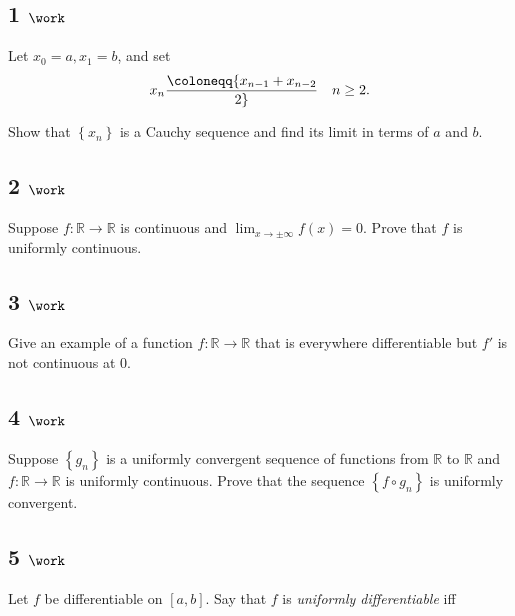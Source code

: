 \hypertarget{work}{%
\subsection{\texorpdfstring{1
\(\work\)}{1 \textbackslash work}}\label{work}}

Let \(x_0 = a, x_1 = b\), and set
\begin{align*}  
x_n \coloneqq{x_{n-1} + x_{n-2} \over 2} \quad n\geq 2
.\end{align*}

Show that \(\left\{{x_n}\right\}\) is a Cauchy sequence and find its
limit in terms of \(a\) and \(b\).

\hypertarget{work-1}{%
\subsection{\texorpdfstring{2
\(\work\)}{2 \textbackslash work}}\label{work-1}}

Suppose \(f:{\mathbb{R}}\to{\mathbb{R}}\) is continuous and
\(\lim_{x\to \pm \infty} f(x) = 0\). Prove that \(f\) is uniformly
continuous.

\hypertarget{work-2}{%
\subsection{\texorpdfstring{3
\(\work\)}{3 \textbackslash work}}\label{work-2}}

Give an example of a function \(f:{\mathbb{R}}\to {\mathbb{R}}\) that is
everywhere differentiable but \(f'\) is not continuous at 0.

\hypertarget{work-3}{%
\subsection{\texorpdfstring{4
\(\work\)}{4 \textbackslash work}}\label{work-3}}

Suppose \(\left\{{g_n}\right\}\) is a uniformly convergent sequence of
functions from \({\mathbb{R}}\) to \({\mathbb{R}}\) and
\(f:{\mathbb{R}}\to {\mathbb{R}}\) is uniformly continuous. Prove that
the sequence \(\left\{{f\circ g_n}\right\}\) is uniformly convergent.

\hypertarget{work-4}{%
\subsection{\texorpdfstring{5
\(\work\)}{5 \textbackslash work}}\label{work-4}}

Let \(f\) be differentiable on \([a, b]\). Say that \(f\) is
\emph{uniformly differentiable} iff

